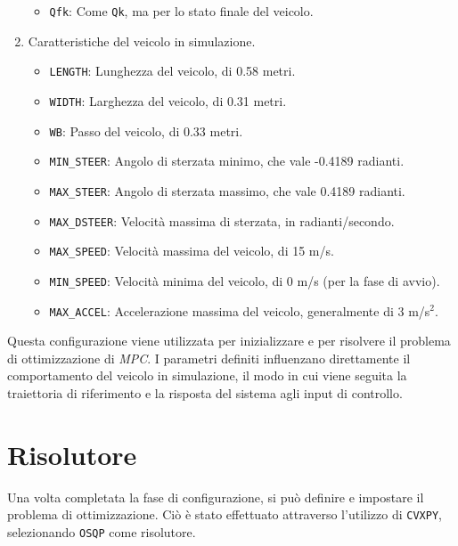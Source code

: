 \begin{enumerate}
\begin{itemize}
        \item \texttt{Qfk}: Come \texttt{Qk}, ma per lo stato finale del veicolo.
    \end{itemize}
    \item Caratteristiche del veicolo in simulazione.
    \begin{itemize}
        \item \texttt{LENGTH}: Lunghezza del veicolo, di 0.58 metri.
        \item \texttt{WIDTH}: Larghezza del veicolo, di 0.31 metri.
        \item \texttt{WB}: Passo del veicolo, di 0.33 metri.
        \item \texttt{MIN\_STEER}: Angolo di sterzata minimo, che vale -0.4189 radianti.
        \item \texttt{MAX\_STEER}: Angolo di sterzata massimo, che vale 0.4189 radianti.
        \item \texttt{MAX\_DSTEER}: Velocità massima di sterzata, in radianti/secondo.
        \item \texttt{MAX\_SPEED}: Velocità massima del veicolo, di 15 m/s.
        \item \texttt{MIN\_SPEED}: Velocità minima del veicolo, di 0 m/s (per la fase di avvio).
        \item \texttt{MAX\_ACCEL}: Accelerazione massima del veicolo, generalmente di
        3 m/s$^2$.
    \end{itemize}
\end{enumerate}
Questa configurazione viene utilizzata per inizializzare e per risolvere il problema di 
ottimizzazione di \textit{MPC}. I parametri definiti influenzano direttamente il comportamento
del veicolo in simulazione, il modo in cui viene seguita la traiettoria di riferimento
e la risposta del sistema agli input di controllo.

\section{Risolutore}
Una volta completata la fase di configurazione, si può definire e impostare il problema di 
ottimizzazione. Ciò è stato effettuato attraverso l'utilizzo di \verb|CVXPY|, selezionando \verb|OSQP| come risolutore. 

